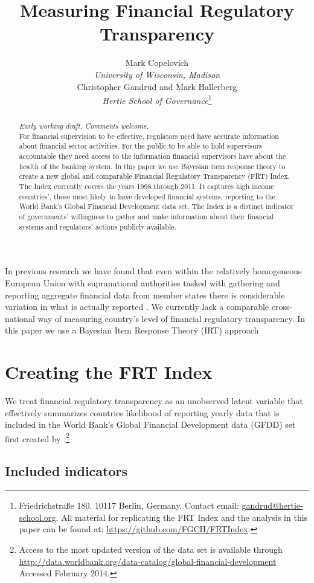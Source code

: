 \documentclass[a4paper]{article}
\title{Measuring Financial Regulatory Transparency}
\author{Mark Copelovich \\ \emph{University of Wisconsin, Madison} \\[0.5cm] Christopher Gandrud and Mark Hallerberg \\ 
    {\emph{Hertie School of Governance}}\footnote{Friedrichstra{\ss}e 180. 10117 Berlin, Germany. Contact email: \href{mailto:gandrud@hertie-school.org}{gandrud@hertie-school.org}. All material for replicating the FRT Index and the analysis in this paper can be found at: \url{https://github.com/FGCH/FRTIndex}.}}
\begin{document}
\maketitle

\begin{abstract}
\noindent \emph{Early working draft. Comments welcome.} \\
For financial supervision to be effective, regulators need have accurate information about financial sector activities. For the public to be able to hold supervisors accountable they need access to the information financial supervisors have about the health of the banking system. In this paper we use Bayesian item response theory to create a new global and comparable Financial Regulatory Transparency (FRT) Index. The Index currently covers the years 1998 through 2011. It captures high income countries', those most likely to have developed financial systems, reporting to the World Bank's Global Financial Development data set. The Index is a distinct indicator of governments' willingness to gather and make information about their financial systems and regulators' actions publicly available. 
\end{abstract}

In previous research we have found that even within the relatively homogeneous European Union with supranational authorities tasked with gathering and reporting aggregate financial data from member states there is considerable variation in what is actually reported \cite[see][]{Gandrud2014a}. We currently lack a comparable cross-national way of measuring country's level of financial regulatory transparency. In this paper we use a Bayesian Item Response Theory (IRT) approach

\section{Creating the FRT Index}

We treat financial regulatory transparency as an unobserved latent variable that effectively summarizes countries likelihood of reporting yearly data that is included in the World Bank's Global Financial Development data (GFDD) set first created by \cite{Cihak2012}.\footnote{Access to the most updated version of the data set is available through \url{http://data.worldbank.org/data-catalog/global-financial-development} Accessed February 2014.}

\subsection{Included indicators}
\end{document}
